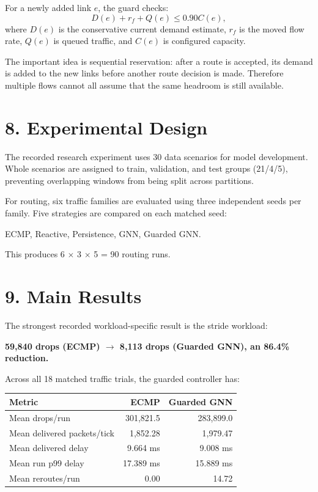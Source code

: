 \documentclass[11pt]{article}
\begin{document}
For a newly added link $e$, the guard checks:
\[
D(e)+r_f+Q(e)\leq0.90C(e),
\]
where $D(e)$ is the conservative current demand estimate, $r_f$ is the moved flow rate, $Q(e)$ is queued traffic, and $C(e)$ is configured capacity.

The important idea is sequential reservation: after a route is accepted, its demand is added to the new links before another route decision is made. Therefore multiple flows cannot all assume that the same headroom is still available.

\section*{8. Experimental Design}
The recorded research experiment uses 30 data scenarios for model development. Whole scenarios are assigned to train, validation, and test groups (21/4/5), preventing overlapping windows from being split across partitions.

For routing, six traffic families are evaluated using three independent seeds per family. Five strategies are compared on each matched seed:
\begin{center}
ECMP, Reactive, Persistence, GNN, Guarded GNN.
\end{center}
This produces 6 $\times$ 3 $\times$ 5 = 90 routing runs.

\section*{9. Main Results}
The strongest recorded workload-specific result is the stride workload:
\begin{center}
\textbf{59,840 drops (ECMP) $\rightarrow$ 8,113 drops (Guarded GNN), an 86.4\% reduction.}
\end{center}

Across all 18 matched traffic trials, the guarded controller has:
\begin{center}
\begin{tabular}{lrr}
\toprule
Metric & ECMP & Guarded GNN\\
\midrule
Mean drops/run & 301,821.5 & 283,899.0\\
Mean delivered packets/tick & 1,852.28 & 1,979.47\\
Mean delivered delay & 9.664 ms & 9.008 ms\\
Mean run p99 delay & 17.389 ms & 15.889 ms\\
Mean reroutes/run & 0.00 & 14.72\\
\bottomrule
\end{tabular}
\end{center}
\end{document}
